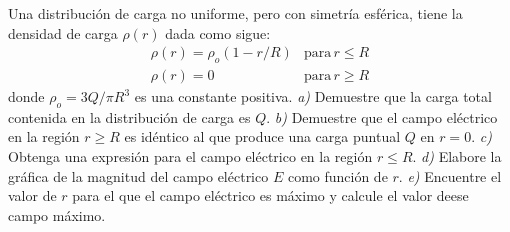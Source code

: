 \begin{mdframed}[style=warning]
	\begin{ejercicio}
		Una distribución de carga no uniforme, pero con simetría esférica, tiene la densidad de carga $\rho (r)$ dada como sigue:
		$$
			\left.\begin{array}{cc}
				\rho (r) = \rho _o (1 - r/R) & \text{para} \, r\leq R \\
				\rho (r) = 0 & \text{para} \, r\geq R
			\end{array}\right.
		$$
		donde $\rho _o = 3Q/\pi R^3$ es una constante positiva. \textit{a)} Demuestre que la carga total contenida en la distribución de carga es $Q$. \textit{b)} Demuestre que el campo eléctrico en la región $r\geq R$ es idéntico al que produce una carga puntual $Q$ en $r = 0$. \textit{c)} Obtenga una expresión para el campo eléctrico en la región $r \leq R$. \textit{d)} Elabore la gráfica de la magnitud del campo eléctrico $E$ como función de $r$. \textit{e)} Encuentre el valor de $r$ para el que el campo eléctrico es máximo y calcule el valor deese campo máximo.
	\end{ejercicio}
\end{mdframed}
















